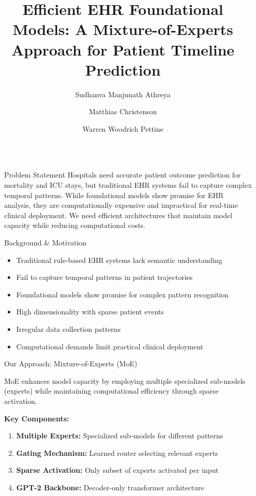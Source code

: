\documentclass[final]{beamer}
\title{Efficient EHR Foundational Models: A Mixture-of-Experts Approach for Patient Timeline Prediction}
\author{Sudhanva Manjunath Athreya \and Matthias Christenson \and Warren Woodrich Pettine}
\institute{AI Summit 2025}
\newlength{\sepwidth}
\newlength{\colwidth}
\newcommand{\separatorcolumn}{\begin{column}{\sepwidth}\end{column}}
\begin{document}
\begin{frame}[t]
\begin{columns}[t]
\separatorcolumn

\begin{column}{\colwidth}

  \begin{alertblock} {Problem Statement}
    Hospitals need accurate patient outcome prediction for mortality and ICU stays, but traditional EHR systems fail to capture complex temporal patterns. While foundational models show promise for EHR analysis, they are computationally expensive and impractical for real-time clinical deployment. We need efficient architectures that maintain model capacity while reducing computational costs.
  \end{alertblock}

    \begin{block} {Background \& Motivation}
        
        \begin{itemize}
            \item Traditional rule-based EHR systems lack semantic understanding
            \item Fail to capture temporal patterns in patient trajectories
            \item Foundational models show promise for complex pattern recognition
            \item High dimensionality with sparse patient events
            \item Irregular data collection patterns
            \item Computational demands limit practical clinical deployment
        \end{itemize}

    \end{block}

    \begin{block}{Our Approach: Mixture-of-Experts (MoE)}

        MoE enhances model capacity by employing multiple specialized sub-models (experts) while maintaining computational efficiency through sparse activation.

        \textbf{Key Components:}
          \begin{enumerate}
              \item \textbf{Multiple Experts:} Specialized sub-models for different patterns
              \item \textbf{Gating Mechanism:} Learned router selecting relevant experts
              \item \textbf{Sparse Activation:} Only subset of experts activated per input
              \item \textbf{GPT-2 Backbone:} Decoder-only transformer architecture
           \end{enumerate}


\end{block}
\end{column}
\end{columns}
\end{frame}
\end{document}
